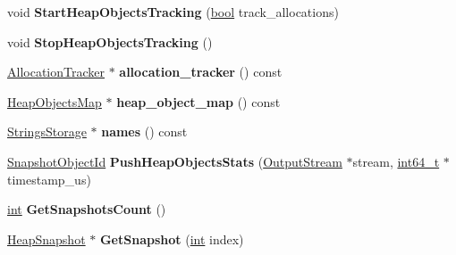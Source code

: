 \begin{DoxyCompactItemize}
void {\bfseries Start\+Heap\+Objects\+Tracking} (\mbox{\hyperlink{classbool}{bool}} track\+\_\+allocations)
\item 
\mbox{\label{classv8_1_1internal_1_1HeapProfiler_a4ee8e40dc2d3ef72428da51cb7eafdee}} 
void {\bfseries Stop\+Heap\+Objects\+Tracking} ()
\item 
\mbox{\label{classv8_1_1internal_1_1HeapProfiler_aefef83b904214c49ccda3822eda87a8c}} 
\mbox{\hyperlink{classv8_1_1internal_1_1AllocationTracker}{Allocation\+Tracker}} $\ast$ {\bfseries allocation\+\_\+tracker} () const
\item 
\mbox{\label{classv8_1_1internal_1_1HeapProfiler_a660896b5f7acda76179d9b9596a3ff80}} 
\mbox{\hyperlink{classv8_1_1internal_1_1HeapObjectsMap}{Heap\+Objects\+Map}} $\ast$ {\bfseries heap\+\_\+object\+\_\+map} () const
\item 
\mbox{\label{classv8_1_1internal_1_1HeapProfiler_a2c3b79b27d7d31d3c379d80d7d4a5820}} 
\mbox{\hyperlink{classv8_1_1internal_1_1StringsStorage}{Strings\+Storage}} $\ast$ {\bfseries names} () const
\item 
\mbox{\label{classv8_1_1internal_1_1HeapProfiler_a3e8339bfde2671aacc0f9ffb6869d1f6}} 
\mbox{\hyperlink{classuint32__t}{Snapshot\+Object\+Id}} {\bfseries Push\+Heap\+Objects\+Stats} (\mbox{\hyperlink{classv8_1_1OutputStream}{Output\+Stream}} $\ast$stream, \mbox{\hyperlink{classint64__t}{int64\+\_\+t}} $\ast$timestamp\+\_\+us)
\item 
\mbox{\label{classv8_1_1internal_1_1HeapProfiler_a674d9a5803aa04e8c5091289aae7d562}} 
\mbox{\hyperlink{classint}{int}} {\bfseries Get\+Snapshots\+Count} ()
\item 
\mbox{\label{classv8_1_1internal_1_1HeapProfiler_a6e1700f861f6260c7e2ecc53c6b7f53b}} 
\mbox{\hyperlink{classv8_1_1internal_1_1HeapSnapshot}{Heap\+Snapshot}} $\ast$ {\bfseries Get\+Snapshot} (\mbox{\hyperlink{classint}{int}} index)
\item 
\mbox{\label{classv8_1_1internal_1_1HeapProfiler_aec86d7e69472ced74bd92574696b4a0e}} 

\end{DoxyCompactItemize}
